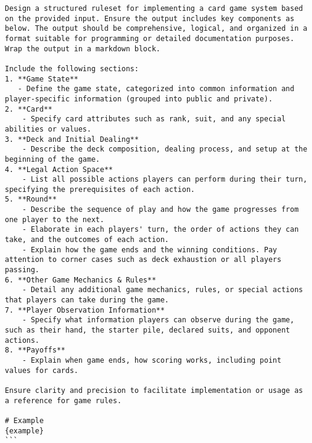 \begin{tcolorbox}[
breakable,
title=Prompts for description structurization,  
colframe=promptcolor, 
colback=white,
]
\begin{lstlisting}[]
Design a structured ruleset for implementing a card game system based on the provided input. Ensure the output includes key components as below. The output should be comprehensive, logical, and organized in a format suitable for programming or detailed documentation purposes. Wrap the output in a markdown block.

Include the following sections:
1. **Game State**
   - Define the game state, categorized into common information and player-specific information (grouped into public and private).
2. **Card**
    - Specify card attributes such as rank, suit, and any special abilities or values.
3. **Deck and Initial Dealing**
    - Describe the deck composition, dealing process, and setup at the beginning of the game.
4. **Legal Action Space**
    - List all possible actions players can perform during their turn, specifying the prerequisites of each action.    
5. **Round**
    - Describe the sequence of play and how the game progresses from one player to the next.
    - Elaborate in each players' turn, the order of actions they can take, and the outcomes of each action.
    - Explain how the game ends and the winning conditions. Pay attention to corner cases such as deck exhaustion or all players passing.
6. **Other Game Mechanics & Rules**
    - Detail any additional game mechanics, rules, or special actions that players can take during the game.
7. **Player Observation Information**
    - Specify what information players can observe during the game, such as their hand, the starter pile, declared suits, and opponent actions.
8. **Payoffs**
    - Explain when game ends, how scoring works, including point values for cards.

Ensure clarity and precision to facilitate implementation or usage as a reference for game rules.

# Example
{example}
```
\end{lstlisting}
\end{tcolorbox}


